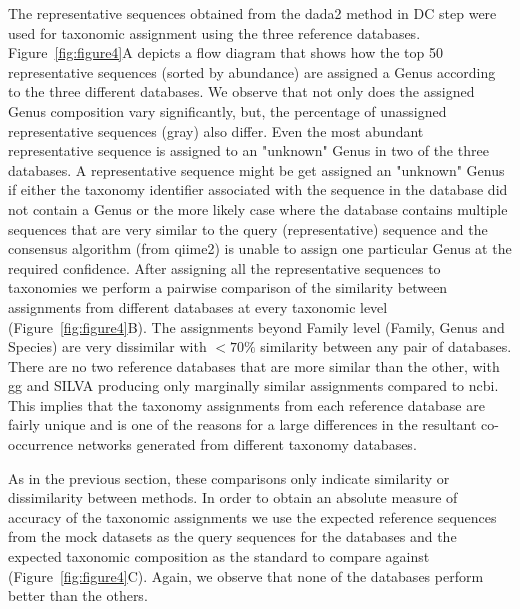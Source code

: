   The representative sequences obtained from the \ac{dada2} method in DC step were used for taxonomic assignment using the three reference databases.
  Figure~\ref{fig:figure4}A depicts a flow diagram that shows how the top 50 representative sequences (sorted by abundance) are assigned a Genus according to the three different databases.
  We observe that not only does the assigned Genus composition vary significantly, but, the percentage of unassigned representative sequences (gray) also differ.
  Even the most abundant representative sequence is assigned to an "unknown" Genus in two of the three databases.
  A representative sequence might be get assigned an "unknown" Genus if either the taxonomy identifier associated with the sequence in the database did not contain a Genus or the more likely case where the database contains multiple sequences that are very similar to the query (representative) sequence and the consensus algorithm (from \ac{qiime2}) is unable to assign one particular Genus at the required confidence.
  After assigning all the representative sequences to taxonomies we perform a pairwise comparison of the similarity between assignments from different databases at every taxonomic level (Figure~\ref{fig:figure4}B).
  The assignments beyond Family level (Family, Genus and Species) are very dissimilar with $<70\%$ similarity between any pair of databases.
  There are no two reference databases that are more similar than the other, with \ac{gg} and SILVA producing only marginally similar assignments compared to \ac{ncbi}.
  This implies that the taxonomy assignments from each reference database are fairly unique and is one of the reasons for a large differences in the resultant co-occurrence networks generated from different taxonomy databases.

  As in the previous section, these comparisons only indicate similarity or dissimilarity between methods.
  In order to obtain an absolute measure of accuracy of the taxonomic assignments we use the expected reference sequences from the mock datasets as the query sequences for the databases and the expected taxonomic composition as the standard to compare against (Figure~\ref{fig:figure4}C).
  Again, we observe that none of the databases perform better than the others.


